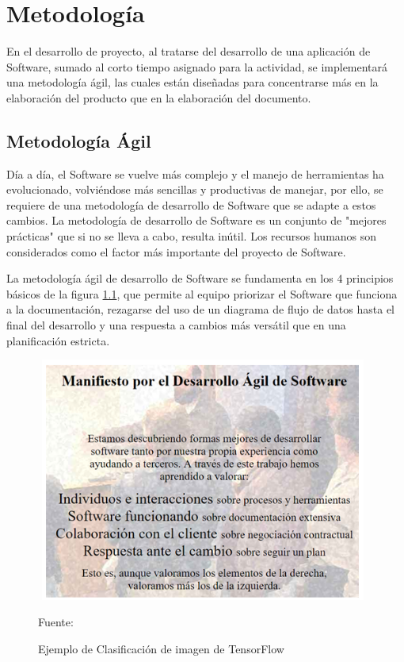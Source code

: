 \chapter{Metodología}

En el desarrollo de proyecto, al tratarse del desarrollo de una aplicación de Software, sumado al corto tiempo asignado para la actividad, se implementará una metodología ágil, las cuales están diseñadas para concentrarse más en la elaboración del producto que en la elaboración del documento.

\section{Metodología Ágil}

Día a día, el Software se vuelve más complejo y el manejo de herramientas ha evolucionado, volviéndose más sencillas y productivas de manejar, por ello, se requiere de una metodología de desarrollo de Software que se adapte a estos cambios.
La metodología de desarrollo de Software es un conjunto de "mejores prácticas" que si no se lleva a cabo, resulta inútil\cite{carrizo2018metodo}. Los recursos humanos son considerados como el factor más importante del proyecto de Software.

La metodología ágil de desarrollo de Software se fundamenta en los 4 principios básicos de la figura \ref{manifiesto}, que permite al equipo priorizar el Software que funciona a la documentación, rezagarse del uso de un diagrama de flujo de datos hasta el final del desarrollo y una respuesta a cambios más versátil que en una planificación estricta.
\\
\begin{figure}[t!]
	\centering
	\includegraphics[width=11cm,height=8cm,]{./Images/manifiesto.png}
	\caption{Ejemplo de Clasificación de imagen de TensorFlow}
	\footnotesize Fuente: \cite{beck2001manifiesto}
	\label{manifiesto}
\end{figure}

